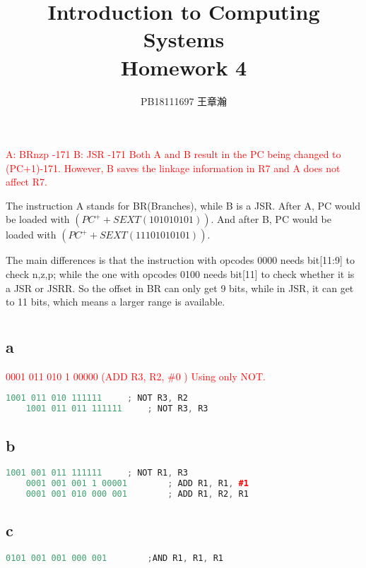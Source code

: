 \documentclass[11pt,a4paper]{article}
\title{Introduction to Computing Systems\\Homework 4}
\author{PB18111697 王章瀚}
\begin{document}
	\maketitle
	\section{}
	\textcolor{red}{
		A: BRnzp -171
		B: JSR -171
		Both A and B result in the PC being changed to (PC+1)-171.
		However, B saves the linkage information in R7 and A does not affect R7.
	}\par
	\qquad The instruction A stands for BR(Branches), while B is a JSR. After A, PC would be loaded with $(PC^{+}+SEXT(101010101))$. And after B, PC would be loaded with $(PC^{+}+SEXT(11101010101))$.\par
	The main differences is that the instruction with opcodes 0000 needs bit[11:9] to check n,z,p; while the one with opcodes 0100 needs bit[11] to check whether it is a JSR or JSRR. So the offset in BR can only get 9 bits, while in JSR, it can get to 11 bits, which means a larger range is available.\par
	
	\section{}
	\subsection*{a}
	\textcolor{red}{
		0001 011 010 1 00000 (ADD R3, R2, \#0 )
		Using only NOT.
	}\par
	\begin{lstlisting}[language=C++]
	1001 011 010 111111		; NOT R3, R2
	1001 011 011 111111		; NOT R3, R3
	\end{lstlisting}
	
	\subsection*{b}
	\begin{lstlisting}[language=C++]
	1001 001 011 111111		; NOT R1, R3
	0001 001 001 1 00001		; ADD R1, R1, #1
	0001 001 010 000 001		; ADD R1, R2, R1
	\end{lstlisting}
	\subsection*{c}
	\begin{lstlisting}[language=C++]
	0101 001 001 000 001		;AND R1, R1, R1
	\end{lstlisting}
\end{document}
